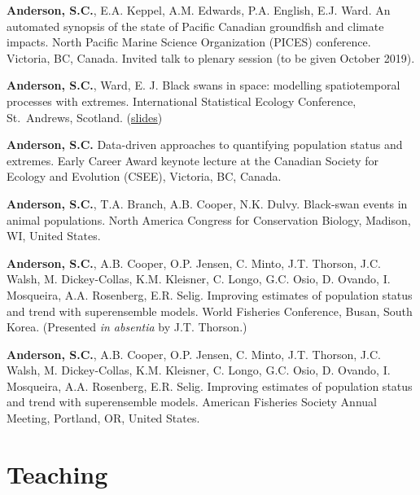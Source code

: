\begin{description}
\tightlist
\item[2019]
\textbf{Anderson, S.C.}, E.A. Keppel, A.M. Edwards, P.A. English, E.J.
Ward. An automated synopsis of the state of Pacific Canadian groundfish
and climate impacts. North Pacific Marine Science Organization (PICES)
conference. Victoria, BC, Canada. Invited talk to plenary session (to be
given October 2019).
\item[2018]
\textbf{Anderson, S.C.}, Ward, E. J. Black swans in space: modelling
spatiotemporal processes with extremes. International Statistical
Ecology Conference, St.\ Andrews, Scotland.
(\href{https://www.dropbox.com/s/ufce52ocpycftk1/anderson-ward-isec-2018.pdf?dl=1}{slides})
\item[2017]
\textbf{Anderson, S.C.} Data-driven approaches to quantifying population
status and extremes. Early Career Award keynote lecture at the Canadian
Society for Ecology and Evolution (CSEE), Victoria, BC, Canada.
\item[2016]
\textbf{Anderson, S.C.}, T.A. Branch, A.B. Cooper, N.K. Dulvy.
Black-swan events in animal populations. North America Congress for
Conservation Biology, Madison, WI, United States.
\item[2016]
\textbf{Anderson, S.C.}, A.B. Cooper, O.P. Jensen, C. Minto, J.T.
Thorson, J.C. Walsh, M. Dickey-Collas, K.M. Kleisner, C. Longo, G.C.
Osio, D. Ovando, I. Mosqueira, A.A. Rosenberg, E.R. Selig. Improving
estimates of population status and trend with superensemble models.
World Fisheries Conference, Busan, South Korea. (Presented \emph{in
absentia} by J.T. Thorson.)
\item[2015]
\textbf{Anderson, S.C.}, A.B. Cooper, O.P. Jensen, C. Minto, J.T.
Thorson, J.C. Walsh, M. Dickey-Collas, K.M. Kleisner, C. Longo, G.C.
Osio, D. Ovando, I. Mosqueira, A.A. Rosenberg, E.R. Selig. Improving
estimates of population status and trend with superensemble models.
American Fisheries Society Annual Meeting, Portland, OR, United States.
\end{description}

\section{Teaching}\label{teaching}

